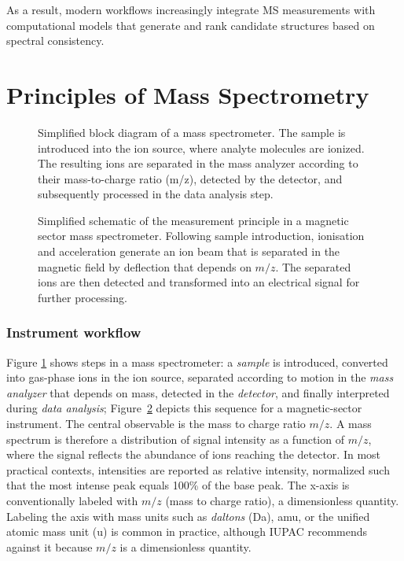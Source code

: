 As a result, modern workflows increasingly integrate MS measurements with computational models that generate and rank candidate structures based on spectral consistency.


\section{Principles of Mass Spectrometry}


\begin{figure}[H]
    \centering
    \resizebox{0.9\textwidth}{!}{}
    \caption[Simplified block diagram of a mass spectrometer]{
        Simplified block diagram of a mass spectrometer.
        The sample is introduced into the ion source, where analyte molecules are ionized.
        The resulting ions are separated in the mass analyzer according to their mass-to-charge ratio (m/z), detected by the detector, and subsequently processed in the data analysis step. \cite{wikibooks-ms-flowchart}
        }
    \label{fig:ms-flow}
\end{figure}

\begin{figure}[H]
    \centering
    \resizebox{0.9\textwidth}{!}{}
    \caption[Simplified schematic of MS measurement principle]{
        Simplified schematic of the measurement principle in a magnetic sector mass spectrometer.
        Following sample introduction, ionisation and acceleration generate an ion beam that is separated in the magnetic field by deflection that depends on $m/z$.
        The separated ions are then detected and transformed into an electrical signal for further processing. \cite{chemguide}
    }
    \label{fig:ms-schematic}
\end{figure}



\subsubsection{Instrument workflow}

Figure \ref{fig:ms-flow} shows steps in a mass spectrometer: a \emph{sample} is introduced, converted into gas-phase ions in the ion source, separated according to motion in the \emph{mass analyzer} that depends on mass, detected in the \emph{detector}, and finally interpreted during \emph{data analysis}; Figure~\ref{fig:ms-schematic} depicts this sequence for a magnetic-sector instrument.
The central observable is the mass to charge ratio $m/z$.
A mass spectrum is therefore a distribution of signal intensity as a function of $m/z$, where the signal reflects the abundance of ions reaching the detector. \cite[p.~1566]{Murray2013}
In most practical contexts, intensities are reported as relative intensity, normalized such that the most intense peak equals 100\% of the base peak.  \cite[p.~1550]{Murray2013}
The x-axis is conventionally labeled with $m/z$ (mass to charge ratio), a dimensionless quantity.
Labeling the axis with mass units such as \emph{daltons} (Da), amu, or the unified atomic mass unit (u) is common in practice, although IUPAC recommends against it because $m/z$ is a dimensionless quantity. \cite[p.~1516]{Murray2013}

